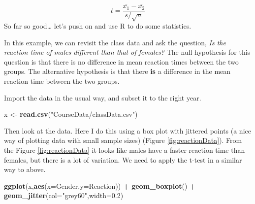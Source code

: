 \documentclass[
  a4paperpaper,
]{book}
\newenvironment{Shaded}{\begin{snugshade}}{\end{snugshade}}
\newcommand{\DataTypeTok}[1]{\textcolor[rgb]{0.13,0.29,0.53}{#1}}
\newcommand{\FloatTok}[1]{\textcolor[rgb]{0.00,0.00,0.81}{#1}}
\newcommand{\KeywordTok}[1]{\textcolor[rgb]{0.13,0.29,0.53}{\textbf{#1}}}
\newcommand{\NormalTok}[1]{#1}
\newcommand{\OperatorTok}[1]{\textcolor[rgb]{0.81,0.36,0.00}{\textbf{#1}}}
\newcommand{\StringTok}[1]{\textcolor[rgb]{0.31,0.60,0.02}{#1}}
\begin{document}
\[t = \frac{\bar{x_1}-\bar{x_2}} {s/ \sqrt{n}}\]
So far so good\ldots{} let's push on and use R to do some statistics.

In this example, we can revisit the class data and ask the question, \emph{Is the reaction time of males different than that of females?} The null hypothesis for this question is that there is no difference in mean reaction times between the two groups. The alternative hypothesis is that there \textbf{is} a difference in the mean reaction time between the two groups.

Import the data in the usual way, and subset it to the right year.

\begin{Shaded}
\begin{Highlighting}[]
\NormalTok{x \textless{}{-}}\StringTok{ }\KeywordTok{read.csv}\NormalTok{(}\StringTok{"CourseData/classData.csv"}\NormalTok{)}
\end{Highlighting}
\end{Shaded}

Then look at the data. Here I do this using a box plot with jittered points (a nice way of plotting data with small sample sizes) (Figure \ref{fig:reactionData}). From the Figure \ref{fig:reactionData} it looks like males have a faster reaction time than females, but there is a lot of variation. We need to apply the t-test in a similar way to above.

\begin{Shaded}
\begin{Highlighting}[]
\KeywordTok{ggplot}\NormalTok{(x,}\KeywordTok{aes}\NormalTok{(}\DataTypeTok{x=}\NormalTok{Gender,}\DataTypeTok{y=}\NormalTok{Reaction)) }\OperatorTok{+}
\StringTok{  }\KeywordTok{geom\_boxplot}\NormalTok{() }\OperatorTok{+}\StringTok{ }
\StringTok{  }\KeywordTok{geom\_jitter}\NormalTok{(}\DataTypeTok{col=}\StringTok{"grey60"}\NormalTok{,}\DataTypeTok{width=}\FloatTok{0.2}\NormalTok{)}
\end{Highlighting}
\end{Shaded}
\end{document}
